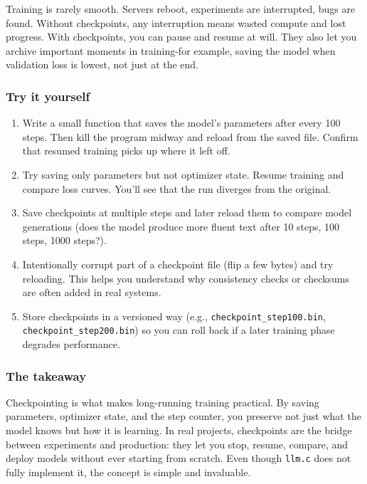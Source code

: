 \documentclass[
  letterpaper,
  DIV=11,
  numbers=noendperiod]{scrreprt}
\providecommand{\tightlist}{%
  \setlength{\itemsep}{0pt}\setlength{\parskip}{0pt}}
\begin{document}
Training is rarely smooth. Servers reboot, experiments are interrupted,
bugs are found. Without checkpoints, any interruption means wasted
compute and lost progress. With checkpoints, you can pause and resume at
will. They also let you archive important moments in training-for
example, saving the model when validation loss is lowest, not just at
the end.

\subsubsection{Try it yourself}\label{try-it-yourself-35}

\begin{enumerate}
\def\labelenumi{\arabic{enumi}.}
\tightlist
\item
  Write a small function that saves the model's parameters after every
  100 steps. Then kill the program midway and reload from the saved
  file. Confirm that resumed training picks up where it left off.
\item
  Try saving only parameters but not optimizer state. Resume training
  and compare loss curves. You'll see that the run diverges from the
  original.
\item
  Save checkpoints at multiple steps and later reload them to compare
  model generations (does the model produce more fluent text after 10
  steps, 100 steps, 1000 steps?).
\item
  Intentionally corrupt part of a checkpoint file (flip a few bytes) and
  try reloading. This helps you understand why consistency checks or
  checksums are often added in real systems.
\item
  Store checkpoints in a versioned way (e.g.,
  \texttt{checkpoint\_step100.bin}, \texttt{checkpoint\_step200.bin}) so
  you can roll back if a later training phase degrades performance.
\end{enumerate}

\subsubsection{The takeaway}\label{the-takeaway-36}

Checkpointing is what makes long-running training practical. By saving
parameters, optimizer state, and the step counter, you preserve not just
what the model knows but how it is learning. In real projects,
checkpoints are the bridge between experiments and production: they let
you stop, resume, compare, and deploy models without ever starting from
scratch. Even though \texttt{llm.c} does not fully implement it, the
concept is simple and invaluable.
\end{document}
